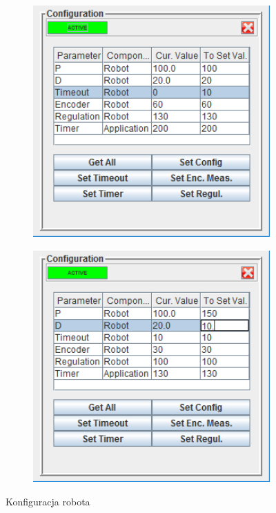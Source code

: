 \documentclass[eng,printmode]{mgr}
\begin{document}
   \begin{figure}[ht]
    \centering
    \begin{subfigure}{.45\textwidth}
     \centering
     \includegraphics[width=1\textwidth]{images/conf1}
     \label{fig:conf1}
    \end{subfigure}
    \begin{subfigure}{.45\textwidth}
     \centering
     \includegraphics[width=1\textwidth]{images/conf2}
     \label{fig:conf2}
    \end{subfigure}
    \caption{Konfiguracja robota}
    \label{fig:Blok_ster}
   \end{figure}
\end{document}
